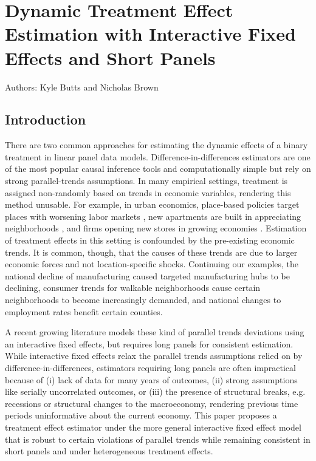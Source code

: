 \chapter{Dynamic Treatment Effect Estimation with Interactive Fixed Effects and Short Panels}
\vspace*{-15mm}
\begin{center}
  Authors: Kyle Butts and Nicholas Brown
\end{center}



\section{Introduction}

There are two common approaches for estimating the dynamic effects of a binary treatment in linear panel data models. Difference-in-differences estimators are one of the most popular causal inference tools and computationally simple but rely on strong parallel-trends assumptions. In many empirical settings, treatment is assigned non-randomly based on trends in economic variables, rendering this method unusable. For example, in urban economics, place-based policies target places with worsening labor markets \citep{neumark2015place}, new apartments are built in appreciating neighborhoods \citep{asquith2021local,pennington2021does}, and firms opening new stores in growing economies \citep{basker2005job,neumark2008effects}. Estimation of treatment effects in this setting is confounded by the pre-existing economic trends. It is common, though, that the causes of these trends are due to larger economic forces and not location-specific shocks. Continuing our examples, the national decline of manufacturing caused targeted manufacturing hubs to be declining, consumer trends for walkable neighborhoods cause certain neighborhoods to become increasingly demanded, and national changes to employment rates benefit certain counties. 

A recent growing literature models these kind of parallel trends deviations using an interactive fixed effects, but requires long panels for consistent estimation. While interactive fixed effects relax the parallel trends assumptions relied on by difference-in-differences, estimators requiring long panels are often impractical because of (i) lack of data for many years of outcomes, (ii) strong assumptions like serially uncorrelated outcomes, or (iii) the presence of structural breaks, e.g. recessions or structural changes to the macroeconomy, rendering previous time periods uninformative about the current economy. This paper proposes a treatment effect estimator under the more general interactive fixed effect model that is robust to certain violations of parallel trends while remaining consistent in short panels and under heterogeneous treatment effects. 

